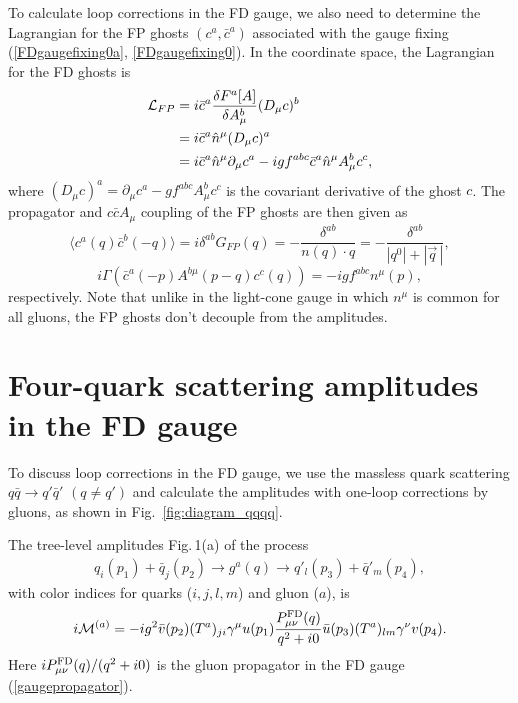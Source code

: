 \documentclass[preprint,amsmath,amssymb,superscriptaddress, floatfix,nofootinbib]{revtex4}
\begin{document}
To calculate loop corrections in the FD gauge, 
we also need to determine the Lagrangian for 
the FP ghosts $(c^a,\bar{c}^a)$ associated with the 
gauge fixing (\ref{FDgaugefixing0a}, \ref{FDgaugefixing0}). 
In the coordinate space, the Lagrangian for the FD ghosts is~\cite{Srednicki:2007qs}
\begin{align}
{\cal L}_{FP}  & = i \bar{c}^a \frac{\delta F^a[A] }{\delta A^b_{\mu}} (D_{\mu} c)^b 
\nonumber \\ 
& = i \bar{c}^a \hat{n}^{\mu}  (D_{\mu} c)^a 
\nonumber \\ 
& = i \bar{c}^a \hat{n}^{\mu}  \partial_{\mu} c^a 
- ig f^{abc} \bar{c}^a \hat{n}^{\mu} A^b_{\mu} c^c ,  
\end{align}
where $(D_{\mu}c)^a=\partial_{\mu}c^a-gf^{abc}A^b_{\mu}c^c$ is 
the covariant derivative of the ghost $c$. 
The propagator and $c\bar{c}A_{\mu}$ coupling of the FP ghosts are then 
given as 
\begin{equation}
\langle c^a(q)\bar{c}^b(-q) \rangle = 
i\delta^{ab} G_{FP}(q) = -\frac{\delta^{ab} }{n(q)\cdot q}
=-\frac{\delta^{ab} }{|q^0|+|\vec{q}\,| }, 
\label{FPFD1}
\end{equation}
\begin{equation}
i\Gamma (  \bar{c}^a(-p)A^{b\mu}(p-q)c^c(q) ) = -igf^{abc}n^{\mu}(p) ,
\label{FPFD2}
\end{equation}
respectively. 
Note that unlike in the light-cone gauge in which $n^\mu$ is common for all gluons, 
the FP ghosts don't decouple from the amplitudes.


\section{Four-quark scattering amplitudes in the FD gauge}
\label{sec:amplitude}

To discuss loop corrections in the FD gauge, we use 
the massless quark scattering $q\bar{q}\to q'\bar{q}'$ $(q\neq q')$ 
and calculate the amplitudes with one-loop corrections by gluons, 
as shown in Fig.~\ref{fig:diagram_qqqq}. 

The tree-level amplitudes Fig.\,1(a) of the process
%
\begin{eqnarray}
q_i(p_1)+\bar{q}_j(p_2)\to g^a(q)\to q'_l(p_3)+\bar{q}'_m(p_4),
\end{eqnarray} 
with color indices for quarks ($i,j,l,m$) and gluon ($a$), 
is 
\begin{equation}
i{\cal M}^{(a)} = -ig^2 \bar{v}(p_2)(T^a)_{ji}\gamma^{\mu}u(p_1)
\frac{ P^{\rm FD}_{\mu\nu}(q) }{ q^2 +i0}
\bar{u}(p_3)(T^a)_{lm}\gamma^{\nu}v(p_4) . \label{eq1}
\end{equation}
Here $iP^{\rm FD}_{\mu\nu}(q)/(q^2+i0)$ is the gluon propagator 
in the FD gauge (\ref{gaugepropagator}). 
\end{document}
